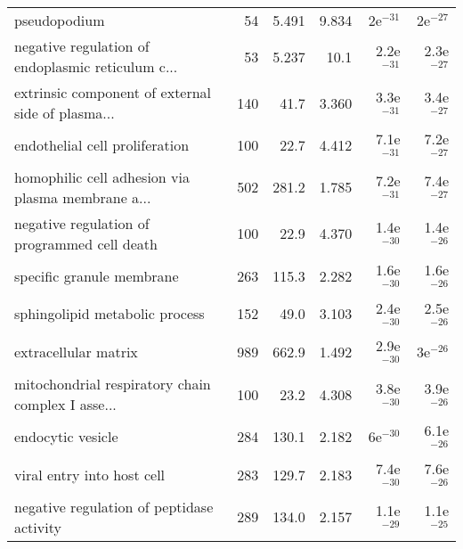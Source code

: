 \begin{longtable}{lrrrrr}
                                      pseudopodium &                      54 &                   5.491 &      9.834 &           2e$^{-31}$ &           2e$^{-27}$ \\
 negative regulation of endoplasmic reticulum c... &                      53 &                   5.237 &       10.1 &         2.2e$^{-31}$ &         2.3e$^{-27}$ \\
 extrinsic component of external side of plasma... &                     140 &                    41.7 &      3.360 &         3.3e$^{-31}$ &         3.4e$^{-27}$ \\
                    endothelial cell proliferation &                     100 &                    22.7 &      4.412 &         7.1e$^{-31}$ &         7.2e$^{-27}$ \\
 homophilic cell adhesion via plasma membrane a... &                     502 &                   281.2 &      1.785 &         7.2e$^{-31}$ &         7.4e$^{-27}$ \\
      negative regulation of programmed cell death &                     100 &                    22.9 &      4.370 &         1.4e$^{-30}$ &         1.4e$^{-26}$ \\
                         specific granule membrane &                     263 &                   115.3 &      2.282 &         1.6e$^{-30}$ &         1.6e$^{-26}$ \\
                    sphingolipid metabolic process &                     152 &                    49.0 &      3.103 &         2.4e$^{-30}$ &         2.5e$^{-26}$ \\
                              extracellular matrix &                     989 &                   662.9 &      1.492 &         2.9e$^{-30}$ &           3e$^{-26}$ \\
 mitochondrial respiratory chain complex I asse... &                     100 &                    23.2 &      4.308 &         3.8e$^{-30}$ &         3.9e$^{-26}$ \\
                                 endocytic vesicle &                     284 &                   130.1 &      2.182 &           6e$^{-30}$ &         6.1e$^{-26}$ \\
                        viral entry into host cell &                     283 &                   129.7 &      2.183 &         7.4e$^{-30}$ &         7.6e$^{-26}$ \\
         negative regulation of peptidase activity &                     289 &                   134.0 &      2.157 &         1.1e$^{-29}$ &         1.1e$^{-25}$ \\

\end{longtable}
